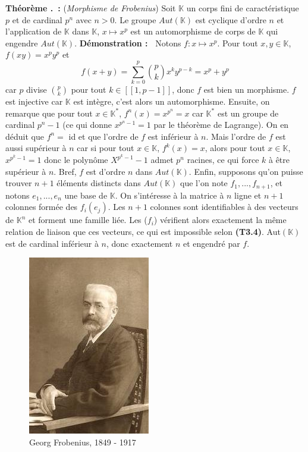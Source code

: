\documentclass[5pt,a4paper]{article}
\newcounter{thm}[section]
\renewcommand{\thethm}{\thesection.\arabic{thm}}
\newcommand{\thm}[1]{\stepcounter{thm}\noindent\textbf{Théorème \thethm ~:} #1 \newline}
\newcommand{\demo}[1]{\textbf{Démonstration :~} #1 \newline}
\begin{document}
\begin{onehalfspacing}
\thm{(\textit{Morphisme de Frobenius}) Soit $\mathbb{K}$ un corps fini de caractéristique $p$ et de cardinal $p^n$ avec $n > 0$. Le groupe $Aut(\mathbb{K})$ est cyclique d'ordre $n$ et l'application de $\mathbb{K}$ dans $\mathbb{K}$, $x \mapsto x^p$ est un automorphisme de corps de $\mathbb{K}$ qui engendre $Aut(\mathbb{K})$.}
\demo{Notons $f : x \mapsto x^p$. Pour tout $x, y \in \mathbb{K}$, $f(xy) = x^py^p$ et 
\[f(x+y) = \displaystyle{\sum_{k=0}^{p}} \binom{p}{k}x^ky^{p-k} = x^p + y^p\] car $p$ divise $\binom{p}{k}$ pour tout $k \in [\![ 1, p-1]\!]$, donc $f$ est bien un morphisme. $f$ est injective car $\mathbb{K}$ est intègre, c'est alors un automorphisme. Ensuite, on remarque que pour tout $x \in \mathbb{K}^{*}$, $f^n(x) = x^{p^n} = x$ car $\mathbb{K}^{*}$ est un groupe de cardinal $p^n-1$ (ce qui donne $x^{p^n - 1} = 1$ par le théorème de Lagrange). On en déduit que $f^n =$ id et que l'ordre de $f$ est inférieur à $n$. Mais l'ordre de $f$ est aussi supérieur à $n$ car si pour tout $x \in \mathbb{K}$, $f^k(x) = x$, alors pour tout $x \in \mathbb{K}$, $x^{p^k - 1} = 1$ donc le polynôme $X^{p^k - 1} - 1$ admet $p^n$ racines, ce qui force $k$ à être supérieur à $n$. Bref, $f$ est d'ordre $n$ dans $Aut(\mathbb{K})$. Enfin, supposons qu'on puisse trouver $n+1$ éléments distincts dans $Aut(\mathbb{K})$ que l'on note $f_1, ..., f_{n+1}$, et notons $e_1, ..., e_n$ une base de $\mathbb{K}$. On s'intéresse à la matrice à $n$ ligne et $n+1$ colonnes formée des $f_i(e_j)$. Les $n+1$ colonnes sont identifiables à des vecteurs de $\mathbb{K}^n$ et forment une famille liée. Les ($f_i$) vérifient alors exactement la même relation de liaison que ces vecteurs, ce qui est impossible selon \textbf{(T3.4)}. Aut$(\mathbb{K})$ est de cardinal inférieur à $n$, donc exactement $n$ et engendré par $f$.}

\begin{figure}[!h]
\centering
\includegraphics[width = 0.33\linewidth]{ressources/frobenius.jpg}
\caption{Georg Frobenius, 1849 - 1917}
\end{figure}



\end{onehalfspacing}
\end{document}
